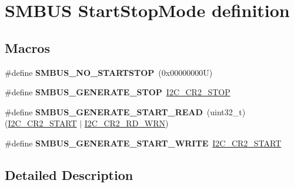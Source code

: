 \hypertarget{group___s_m_b_u_s___start_stop_mode__definition}{}\section{S\+M\+B\+US Start\+Stop\+Mode definition}
\label{group___s_m_b_u_s___start_stop_mode__definition}
\subsection*{Macros}
\begin{DoxyCompactItemize}
\item 
\mbox{\label{group___s_m_b_u_s___start_stop_mode__definition_gaf8819a2a9cf7044b66063d6b598a5a65}} 
\#define {\bfseries S\+M\+B\+U\+S\+\_\+\+N\+O\+\_\+\+S\+T\+A\+R\+T\+S\+T\+OP}~(0x00000000\+U)
\item 
\mbox{\label{group___s_m_b_u_s___start_stop_mode__definition_ga135d9e86e6c192d73113806c1c154be2}} 
\#define {\bfseries S\+M\+B\+U\+S\+\_\+\+G\+E\+N\+E\+R\+A\+T\+E\+\_\+\+S\+T\+OP}~\hyperlink{group___peripheral___registers___bits___definition_ga37007be453dd8a637be2d793d3b5f2a2}{I2\+C\+\_\+\+C\+R2\+\_\+\+S\+T\+OP}
\item 
\mbox{\label{group___s_m_b_u_s___start_stop_mode__definition_ga45a3a3ecdab4699261500647b5e474fe}} 
\#define {\bfseries S\+M\+B\+U\+S\+\_\+\+G\+E\+N\+E\+R\+A\+T\+E\+\_\+\+S\+T\+A\+R\+T\+\_\+\+R\+E\+AD}~(uint32\+\_\+t)(\hyperlink{group___peripheral___registers___bits___definition_ga5ac78b87a12a9eaf564f5a3f99928478}{I2\+C\+\_\+\+C\+R2\+\_\+\+S\+T\+A\+RT} $\vert$ \hyperlink{group___peripheral___registers___bits___definition_ga268ec714bbe4a75ea098c0e230a87697}{I2\+C\+\_\+\+C\+R2\+\_\+\+R\+D\+\_\+\+W\+RN})
\item 
\mbox{\label{group___s_m_b_u_s___start_stop_mode__definition_gacab8e120919df66817ed93c882d96ab2}} 
\#define {\bfseries S\+M\+B\+U\+S\+\_\+\+G\+E\+N\+E\+R\+A\+T\+E\+\_\+\+S\+T\+A\+R\+T\+\_\+\+W\+R\+I\+TE}~\hyperlink{group___peripheral___registers___bits___definition_ga5ac78b87a12a9eaf564f5a3f99928478}{I2\+C\+\_\+\+C\+R2\+\_\+\+S\+T\+A\+RT}
\end{DoxyCompactItemize}


\subsection{Detailed Description}
